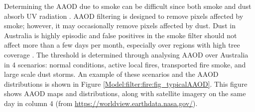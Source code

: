     
    
    
    
    
    Determining the AAOD due to smoke can be difficult since both smoke and dust absorb UV radiation \parencite{Ahn2008, Marais2012}.
    AAOD filtering is designed to remove pixels affected by smoke; however, it may occasionally remove pixels affected by dust.
    Dust in Australia is highly episodic and false positives in the smoke filter should not affect more than a few days per month, especially over regions with high tree coverage \parencite{Shao2007}.
    The threshold is determined through analysing AAOD over Australia in 4 scenarios: normal conditions, active local fires, transported fire smoke, and large scale dust storms.
    An example of these scenarios and the AAOD distributions is shown in Figure \ref{Model:filter:fire:fig_typicalAAOD}. 
    This figure shows AAOD maps and distributions, along with satellite imagery on the same day in column 4 (from \url{https://worldview.earthdata.nasa.gov/}).
    
